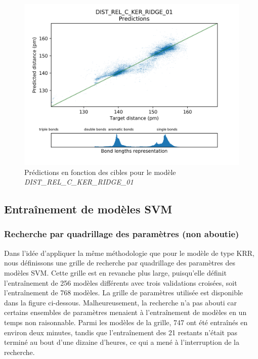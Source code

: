 \begin{figure}[!h]
	\centering
	
	\includegraphics[scale=0.8]{../figures/DIST_REL_C_KER_RIDGE_01/DIST_REL_C_KER_RIDGE_01_preds_targets.png}	
	
	\caption{Prédictions en fonction des cibles pour le modèle \emph{DIST\_REL\_C\_KER\_RIDGE\_01}}
	
\end{figure}

\subsection{Entraînement de modèles SVM}

\subsubsection{Recherche par quadrillage des paramètres (non aboutie)}
Dans l'idée d'appliquer la même méthodologie que pour le modèle de type KRR, nous définissons une grille de recherche par quadrillage des paramètres des modèles SVM. Cette grille est en revanche plus large, puisqu'elle définit l'entraînement de 256 modèles différents avec trois validations croisées, soit l'entraînement de 768 modèles.
La grille de paramètres utilisée est disponible dans la figure ci-dessous. Malheureusement, la recherche n'a pas abouti car certains ensembles de paramètres menaient à l'entraînement de modèles en un temps non raisonnable. Parmi les modèles de la grille, 747 ont été entraînés en environ deux minutes, tandis que l'entraînement des 21 restants n'était pas terminé au bout d'une dizaine d'heures, ce qui a mené à l'interruption de la recherche.

